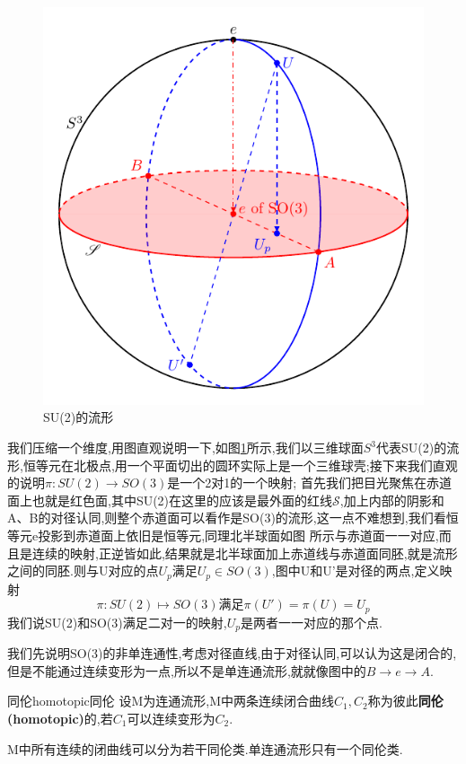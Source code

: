 \documentclass[../main.tex]{subfiles}
\begin{document}
 \begin{figure}[htbp]
     \centering
     \includegraphics{../tikzpicture/SU2.pdf}
     \caption{SU(2)的流形}
     \label{SU(2)的流形图}
 \end{figure}
 我们压缩一个维度,用图直观说明一下,如图\ref{SU(2)的流形图}所示,我们以三维球面$S^3$代表SU(2)的流形,恒等元在北极点,用一个平面切出的圆环实际上是一个三维球壳;接下来我们直观的说明$\pi:SU(2)\rightarrow SO(3)$是一个2对1的一个映射;
 首先我们把目光聚焦在赤道面上也就是红色面,其中SU(2)在这里的应该是最外面的红线$\mathscr{S}$,加上内部的阴影和A、B的对径认同,则整个赤道面可以看作是SO(3)的流形,这一点不难想到,我们看恒等元e投影到赤道面上依旧是恒等元,同理北半球面如图
 所示与赤道面一一对应,而且是连续的映射,正逆皆如此,结果就是北半球面加上赤道线与赤道面同胚,就是流形之间的同胚.则与U对应的点$U_p$满足$U_p \in SO(3)$,图中U和U'是对径的两点,定义映射$$\pi:SU(2) \mapsto SO(3)\text{满足} \pi(U') = \pi(U) = U_p$$
 我们说SU(2)和SO(3)满足二对一的映射,$U_p$是两者一一对应的那个点.

 我们先说明SO(3)的非单连通性,考虑对径直线,由于对径认同,可以认为这是闭合的,但是不能通过连续变形为一点,所以不是单连通流形,就就像图中的$B\rightarrow e \rightarrow A$.
 \begin{definition}{同伦homotopic}{同伦}
     设M为连通流形,M中两条连续闭合曲线$C_1,C_2$称为彼此\textbf{同伦(homotopic)}的,若$C_1$可以连续变形为$C_2$.
 \end{definition}
 M中所有连续的闭曲线可以分为若干同伦类.单连通流形只有一个同伦类.
\end{document}
